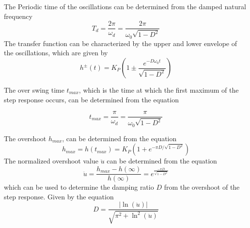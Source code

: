 \documentclass[12pt, oneside, a4paper]{scrreprt}
\begin{document}
                    The Periodic time of the oscillations can be determined from the damped natural frequency 
                    \begin{equation}
                        T_d = \frac{2\pi}{\omega_d} = \frac{2\pi}{\omega_0 \sqrt{1 - D^2}}
                    \end{equation}
                    The transfer function can be characterized by the upper and lower envelope of the oscillations, which are given by 
                    \begin{equation}
                        h^\pm(t) = K_P \left(1 \pm \frac{e^{-D\omega_0 t}}{\sqrt{1-D^2}}\right)
                    \end{equation}
                    
                    The over swing time $t_{max}$, which is the time at which the first maximum of the step response occurs, can be determined from the equation 

                    \begin{equation}
                        t_{max} = \frac{\pi}{\omega_d} = \frac{\pi}{\omega_0 \sqrt{1 - D^2}}
                    \end{equation}

                    The overshoot $h_{max}$, can be determined from the equation 
                    \begin{equation}
                        h_{max} = h(t_{max}) = K_P \left(1 + e^{-\pi D/\sqrt{1-D^2}}\right)
                    \end{equation}
                    The normalized overshoot value $\ddot{u}$ can be determined from the equation
                    \begin{equation}
                        \ddot{u} = \frac{h_{max} - h(\infty)}{h(\infty)} = e^{\frac{-\pi D}{\sqrt{1-D^2}}}
                    \end{equation}
                    which can be used to determine the damping ratio $D$ from the overshoot of the step response. Given by the equation 
                    \begin{equation}
                        D = \frac{\left| \ln(\ddot{u}) \right|}{\sqrt{\pi^2 + \ln^2(\ddot{u})}}
                    \end{equation}


\end{document}
